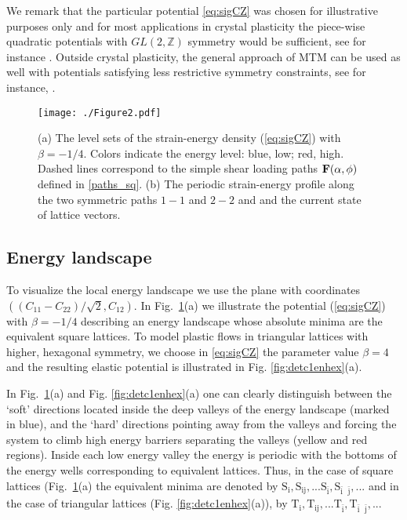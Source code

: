 \documentclass[CRPHYS,Unicode,manuscript]{cedram}
\begin{document}
We remark that the particular potential  \eqref{eq:sigCZ} was chosen for illustrative purposes only and for most applications in crystal plasticity the piece-wise quadratic potentials with $GL(2,\mathbb Z)$ symmetry would be sufficient, see for instance \cite{Salman2012-oa,Zhang2020-ax}. Outside crystal plasticity, the general approach of MTM can be used as well with potentials  satisfying less restrictive symmetry constraints, see for instance, \cite{Friesecke2002-hb}.
 
\begin{figure}[tbp]
\centering
\texttt{[image: ./Figure2.pdf]}
\caption{\scriptsize {(a) The level sets of  the strain-energy density   (\ref{eq:sigCZ})  with $\beta=-1/4$. Colors indicate the energy level: blue, low; red, high. Dashed lines correspond to the  simple shear loading paths $\bold F(\alpha,\phi)$ defined  in  \eqref{paths_sq}.
(b) The periodic strain-energy profile along the two symmetric paths $1-1$ and $2-2$ and and the current state of lattice vectors.}
 \label{fig:detc1ensq}}
\end{figure}

\subsection{Energy landscape}

To visualize   the   local energy landscape  we  use the  plane with  coordinates  $((C_{11}-C_{22})/\sqrt{2},C_{12})$.  In Fig.~\ref{fig:detc1ensq}(a) we  illustrate  the potential (\ref{eq:sigCZ})  with   $\beta=-1/4$ describing an energy landscape whose absolute minima are the equivalent square lattices.  
To model  plastic flows  in triangular lattices  with  higher, hexagonal symmetry,  we  choose in \eqref{eq:sigCZ} the parameter value $\beta=4$ and the resulting elastic potential is illustrated  in Fig. \ref{fig:detc1enhex}(a). 
 
  In Fig.~\ref{fig:detc1ensq}(a) and Fig. \ref{fig:detc1enhex}(a)  one can   clearly distinguish between the  `soft' directions  located inside the deep valleys of the energy landscape (marked in blue), and the  `hard' directions pointing away from the valleys and forcing the  system   to climb  high energy barriers separating the valleys (yellow and red regions).  Inside each low energy  valley the energy is periodic with  the bottoms of the   energy wells corresponding to equivalent lattices. Thus, in the case of square lattices (Fig.~\ref{fig:detc1ensq}(a)  the  equivalent minima are denoted by   $\mathrm{S_i,S_{ij},...S_{\bar i},S_{\bar{i}\text{ }\bar{j} },.}..$ and in the case of triangular lattices (Fig. \ref{fig:detc1enhex}(a)), by  $\mathrm{T_i,T_{ij},...T_{\bar i},T_{\bar{i}\text{ } \bar{j}},..}.$   
  
\end{document}
